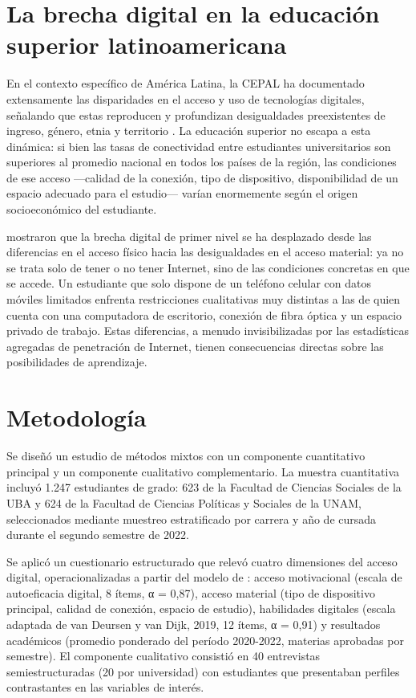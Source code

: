 \section{La brecha digital en la educación superior latinoamericana}
En el contexto específico de América Latina, la CEPAL ha documentado extensamente las disparidades en el acceso y uso de tecnologías digitales, señalando que estas reproducen y profundizan desigualdades preexistentes de ingreso, género, etnia y territorio \autocite*{2566-CEPAL2021}. La educación superior no escapa a esta dinámica: si bien las tasas de conectividad entre estudiantes universitarios son superiores al promedio nacional en todos los países de la región, las condiciones de ese acceso —calidad de la conexión, tipo de dispositivo, disponibilidad de un espacio adecuado para el estudio— varían enormemente según el origen socioeconómico del estudiante.

\autocite{2564-VANDEURSENA2019} mostraron que la brecha digital de primer nivel se ha desplazado desde las diferencias en el acceso físico hacia las desigualdades en el acceso material: ya no se trata solo de tener o no tener Internet, sino de las condiciones concretas en que se accede. Un estudiante que solo dispone de un teléfono celular con datos móviles limitados enfrenta restricciones cualitativas muy distintas a las de quien cuenta con una computadora de escritorio, conexión de fibra óptica y un espacio privado de trabajo. Estas diferencias, a menudo invisibilizadas por las estadísticas agregadas de penetración de Internet, tienen consecuencias directas sobre las posibilidades de aprendizaje.


\section{Metodología}
Se diseñó un estudio de métodos mixtos con un componente cuantitativo principal y un componente cualitativo complementario. La muestra cuantitativa incluyó 1.247 estudiantes de grado: 623 de la Facultad de Ciencias Sociales de la UBA y 624 de la Facultad de Ciencias Políticas y Sociales de la UNAM, seleccionados mediante muestreo estratificado por carrera y año de cursada durante el segundo semestre de 2022.

Se aplicó un cuestionario estructurado que relevó cuatro dimensiones del acceso digital, operacionalizadas a partir del modelo de \autocite*{2563-VANDIJK2020}: acceso motivacional (escala de autoeficacia digital, 8 ítems, α = 0,87), acceso material (tipo de dispositivo principal, calidad de conexión, espacio de estudio), habilidades digitales (escala adaptada de van Deursen y van Dijk, 2019, 12 ítems, α = 0,91) y resultados académicos (promedio ponderado del período 2020-2022, materias aprobadas por semestre). El componente cualitativo consistió en 40 entrevistas semiestructuradas (20 por universidad) con estudiantes que presentaban perfiles contrastantes en las variables de interés.


